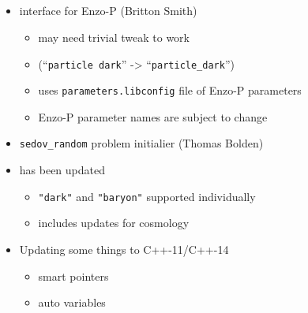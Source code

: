 \NEWSEC


\subsection{\ssRecentMisc}

\begin{frame}[fragile,label=ss-recent-misc] 
\secframetitle{\ssRecentMisc}
\begin{itemize}
\item {} interface for Enzo-P (Britton Smith)
\begin{itemize}
\item may need trivial tweak to work
\item (``\verb+particle dark+'' -> ``\verb+particle_dark+'')
\item uses \verb+parameters.libconfig+ file of Enzo-P parameters
\item Enzo-P parameter names are subject to change
\end{itemize}
\item \verb+sedov_random+ problem initialier (Thomas Bolden)
\item {} has been updated
\begin{itemize}
\item \verb+"dark"+ and \verb+"baryon"+ supported individually
\item includes updates for cosmology
\end{itemize}
\item Updating some things to C++-11/C++-14
\begin{itemize}
\item  smart pointers
\item  auto variables
\end{itemize}
\end{itemize}
\end{frame}
